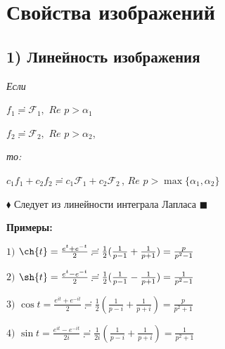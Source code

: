 \documentclass[a4paper, 12pt]{report}
\begin{document}
\section{Свойства изображений}
\subsection*{1) Линейность изображения}
\par
\textsl{Если}
\par\bigskip
\begin{center}
$f_1 \risingdotseq \mathcal{F}_1, $ $Re$ $p > \alpha_1$
\par
$f_2 \risingdotseq \mathcal{F}_2, $ $Re$ $p > \alpha_2$,
\end{center}
\par
\textsl{то:}
\begin{center}
\par 
$c_1 f_1 + c_2 f_2 \risingdotseq c_1 \mathcal{F}_1 + c_2 \mathcal{F}_2$\,, $Re$ $p > \max\{\alpha_1, \alpha_2\}$
\end{center}
\par\bigskip
$\blacklozenge$ \quad Следует из линейности интеграла Лапласа \quad $\blacksquare$
\par\bigskip
\textbf{Примеры:}
\begin{center}
$1)$ $\ch{t} = \frac{e^t + e^{-t}}{2} \risingdotseq \frac{1}{2} (\frac{1}{p - 1} + \frac{1}{p + 1}) = \frac{p}{p^2 - 1}$
\par\bigskip
$2)$ $\sh{t} = \frac{e^t - e^{-t}}{2} \risingdotseq \frac{1}{2} (\frac{1}{p - 1} - \frac{1}{p + 1}) = \frac{1}{p^2 - 1}$
\par\bigskip
$3)$ $\cos{t} = \frac{e^{it} + e^{-it}}{2} \risingdotseq \frac{1}{2} (\frac{1}{p - i} + \frac{1}{p + i}) = \frac{p}{p^2 + 1}$
\par\bigskip
$4)$ $\sin{t} = \frac{e^{it} - e^{-it}}{2i} \risingdotseq \frac{1}{2i} (\frac{1}{p - i} + \frac{1}{p + i}) = \frac{1}{p^2 + 1}$
\end{center}
\par\bigskip
\end{document}
